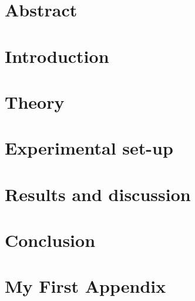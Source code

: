 \documentclass[a4paper,10pt,twoside]{report}
\author{\me}
\begin{document}


\normalsize

\chapter*{Abstract}\label{chapter:Abstract}
\setcounter{page}{0}


\tableofcontents

\chapter{Introduction}\label{chapter:Introduction}
\setcounter{page}{0}


\chapter{Theory}\label{chapter:Theory}


\chapter{Experimental set-up}\label{chapter:Experimental set-up}


\chapter{Results and discussion}\label{chapter:Results and discussion}


\chapter{Conclusion}\label{chapter:Conclusion}




\newpage

\appendix
{}
\chapter{My First Appendix}\label{chapter:Appendix A}

\end{document}
